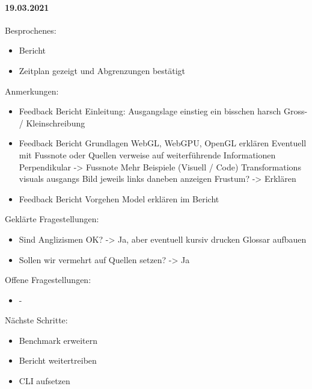 \paragraph{19.03.2021}
Besprochenes:
\begin{itemize}
  \item Bericht
  \item Zeitplan gezeigt und Abgrenzungen bestätigt
\end{itemize}
Anmerkungen:
\begin{itemize}
  \item Feedback Bericht Einleitung:
    \subitem Ausgangslage einstieg ein bisschen harsch
    \subitem Gross- / Kleinschreibung
  \item Feedback Bericht Grundlagen
    \subitem WebGL, WebGPU, OpenGL erklären
    \subitem Eventuell mit Fussnote oder Quellen verweise auf weiterführende Informationen
    \subitem Perpendikular -> Fussnote
    \subitem Mehr Beispiele (Visuell / Code)
    \subitem Transformations visuals ausgangs Bild jeweils links daneben anzeigen
    \subitem Frustum? -> Erklären
  \item Feedback Bericht Vorgehen
    \subitem Model erklären im Bericht
\end{itemize}
Geklärte Fragestellungen:
\begin{itemize}
  \item Sind Anglizismen OK? -> Ja, aber eventuell kursiv drucken
    \subitem Glossar aufbauen
  \item Sollen wir vermehrt auf Quellen setzen? -> Ja
\end{itemize}
Offene Fragestellungen:
\begin{itemize}
  \item -
\end{itemize}
Nächste Schritte:
\begin{itemize}
  \item Benchmark erweitern
  \item Bericht weitertreiben
  \item CLI aufsetzen
\end{itemize}

\newpage

